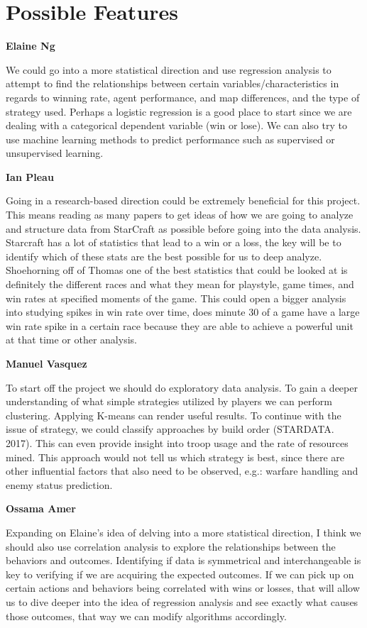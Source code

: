 \documentclass[a4paper,12pt]{report}
\newcommand{\msection}[1]{\noindent\textbf{#1}}
\begin{document}
\section{Possible Features}

\msection{Elaine Ng}

We could go into a more statistical direction and use regression analysis to attempt to find the relationships between certain variables/characteristics in regards to winning rate, agent performance, and map differences, and the type of strategy used. Perhaps a logistic regression is a good place to start since we are dealing with a categorical dependent variable (win or lose). We can also try to use machine learning methods to predict performance such as supervised or unsupervised learning.

\msection{Ian Pleau}

Going in a research-based direction could be extremely beneficial for this project. This means reading as many papers to get ideas of how we are going to analyze and structure data from StarCraft as possible before going into the data analysis. Starcraft has a lot of statistics that lead to a win or a loss, the key will be to identify which of these stats are the best possible for us to deep analyze. Shoehorning off of Thomas one of the best statistics that could be looked at is definitely the different races and what they mean for playstyle, game times, and win rates at specified moments of the game. This could open a bigger analysis into studying spikes in win rate over time, does minute 30 of a game have a large win rate spike in a certain race because they are able to achieve a powerful unit at that time or other analysis.

\msection{Manuel Vasquez}

To start off the project we should do exploratory data analysis. To gain a deeper understanding of what simple strategies utilized by players we can perform clustering. Applying K-means can render useful results. To continue with the issue of strategy, we could classify approaches by build order (STARDATA. 2017). This can even provide insight into troop usage and the rate of resources mined. This approach would not tell us which strategy is best, since there are other influential factors that also need to be observed, e.g.: warfare handling and enemy status prediction.

\msection{Ossama Amer}

Expanding on Elaine’s idea of delving into a more statistical direction, I think we should also use correlation analysis to explore the relationships between the behaviors and outcomes. Identifying if data is symmetrical and interchangeable is key to verifying if we are acquiring the expected outcomes. If we can pick up on certain actions and behaviors being correlated with wins or losses, that will allow us to dive deeper into the idea of regression analysis and see exactly what causes those outcomes, that way we can modify algorithms accordingly.
\end{document}
